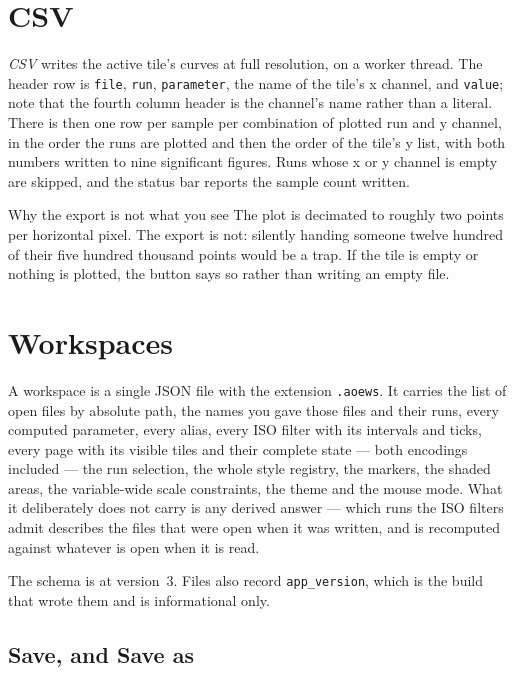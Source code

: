 \documentclass[11pt,a4paper,oneside]{report}
\newcommand{\code}[1]{\texttt{#1}}
\begin{document}
\section{CSV}

\emph{CSV} writes the active tile's curves at full resolution, on a worker
thread. The header row is \code{file}, \code{run}, \code{parameter}, the name of
the tile's x channel, and \code{value}; note that the fourth column header is the
channel's name rather than a literal. There is then one row per sample per
combination of plotted run and y channel, in the order the runs are plotted and
then the order of the tile's y list, with both numbers written to nine
significant figures. Runs whose x or y channel is empty are skipped, and the
status bar reports the sample count written.

\begin{aoenote}{Why the export is not what you see}
The plot is decimated to roughly two points per horizontal pixel. The export is
not: silently handing someone twelve hundred of their five hundred thousand
points would be a trap. If the tile is empty or nothing is plotted, the button
says so rather than writing an empty file.
\end{aoenote}

\section{Workspaces}
\label{sec:workspaces}

A workspace is a single JSON file with the extension \code{.aoews}. It carries
the list of open files by absolute path, the names you gave those files and their
runs, every computed parameter, every alias, every ISO filter with its intervals
and ticks, every page with its visible tiles and their complete state --- both
encodings included --- the run selection, the whole style registry, the markers,
the shaded areas, the variable-wide scale constraints, the theme and the mouse
mode. What it deliberately does not carry is any derived answer --- which runs
the ISO filters admit describes the files that were open when it was written, and
is recomputed against whatever is open when it is read.

The schema is at version~3. Files also record \code{app\_version}, which is the
build that wrote them and is informational only.

\subsection{Save, and Save as}
\end{document}
